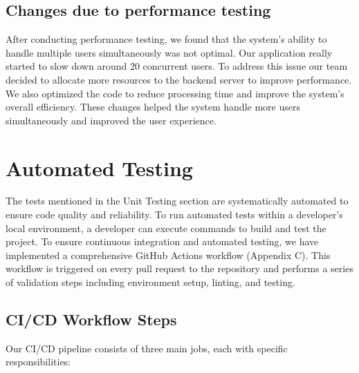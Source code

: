 \documentclass[12pt, titlepage]{article}
\begin{document}
\subsection{Changes due to performance testing}
After conducting performance testing, we found that the system's ability to handle multiple users simultaneously was not optimal. Our application really started to slow down around 20 concurrent users. To address this issue our team decided to allocate more resources to the backend server to improve performance. We also optimized the code to reduce processing time and improve the system's overall efficiency. These changes helped the system handle more users simultaneously and improved the user experience.
\newpage
\section{Automated Testing}

The tests mentioned in the Unit Testing section are systematically automated to ensure code quality and reliability. To run automated tests within a developer's local environment, a developer can execute commands to build and test the project.
\newline
To ensure continuous integration and automated testing, we have implemented a comprehensive GitHub Actions workflow (Appendix C). This workflow is triggered on every pull request to the repository and performs a series of validation steps including environment setup, linting, and testing.
\subsection{CI/CD Workflow Steps}

Our CI/CD pipeline consists of three main jobs, each with specific responsibilities:
\end{document}
